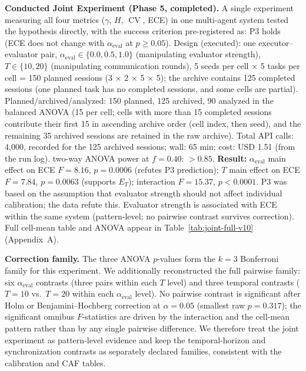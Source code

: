 \documentclass[11pt]{article}
\DeclareMathOperator{\CV}{CV}
\begin{document}
\textbf{Conducted Joint Experiment (Phase 5, completed).} A single experiment measuring all four metrics ($\gamma$, $H$, $\CV$, ECE) in one multi-agent system tested the hypothesis directly, with the success criterion pre-registered as: P3 holds (ECE does not change with $\alpha_{\text{eval}}$ at $p \geq 0.05$). Design (executed): one executor--evaluator pair, $\alpha_{\text{eval}} \in \{0.0, 0.5, 1.0\}$ (manipulating evaluator strength), $T \in \{10, 20\}$ (manipulating communication rounds), 5 seeds per cell $\times$ 5 tasks per cell = 150 planned sessions (3 $\times$ 2 $\times$ 5 $\times$ 5); the archive contains 125 completed sessions (one planned task has no completed sessions, and some cells are partial). Planned/archived/analyzed: 150 planned, 125 archived, 90 analyzed in the balanced ANOVA (15 per cell; cells with more than 15 completed sessions contribute their first 15 in ascending archive order (cell index, then seed), and the remaining 35 archived sessions are retained in the raw archive). Total API calls: 4{,}000, recorded for the 125 archived sessions; wall: 65 min; cost: USD 1.51 (from the run log). two-way ANOVA power at $f = 0.40$: $> 0.85$. \textbf{Result:} $\alpha_{\text{eval}}$ main effect on ECE $F = 8.16$, $p = 0.0006$ (refutes P3 prediction); $T$ main effect on ECE $F = 7.84$, $p = 0.0063$ (supports $E_T$); interaction $F = 15.37$, $p < 0.0001$. P3 was based on the assumption that evaluator strength should not affect individual calibration; the data refute this. Evaluator strength is associated with ECE within the same system (pattern-level; no pairwise contrast survives correction). Full cell-mean table and ANOVA appear in Table~\ref{tab:joint-full-v10} (Appendix~A).

\textbf{Correction family.} The three ANOVA $p$-values form the $k{=}3$ Bonferroni family for this experiment. We additionally reconstructed the full pairwise family: six $\alpha_{\text{eval}}$ contrasts (three pairs within each $T$ level) and three temporal contrasts ($T{=}10$ vs.\ $T{=}20$ within each $\alpha_{\text{eval}}$ level). No pairwise contrast is significant after Holm or Benjamini--Hochberg correction at $\alpha{=}0.05$ (smallest raw $p = 0.317$); the significant omnibus $F$-statistics are driven by the interaction and the cell-mean pattern rather than by any single pairwise difference. We therefore treat the joint experiment as pattern-level evidence and keep the temporal-horizon and synchronization contrasts as separately declared families, consistent with the calibration and CAF tables.
\end{document}
